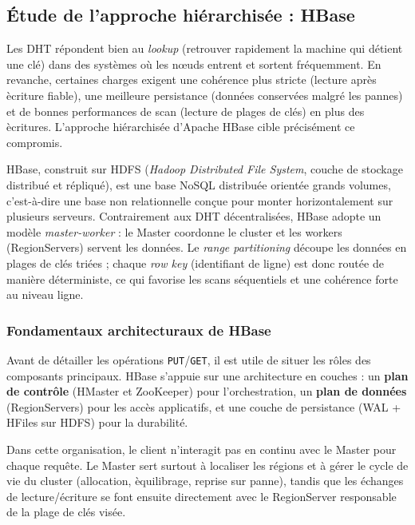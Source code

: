 \subsection{\'Etude de l'approche hi\'erarchis\'ee : HBase}

Les DHT r\'epondent bien au \emph{lookup} (retrouver rapidement la machine qui d\'etient une cl\'e) dans des syst\`emes o\`u les n\oe uds entrent et sortent fr\'equemment. En revanche, certaines charges exigent une coh\'erence plus stricte (lecture apr\`es \`ecriture fiable), une meilleure persistance (donn\'ees conserv\'ees malgr\'e les pannes) et de bonnes performances de scan (lecture de plages de cl\'es) en plus des \`ecritures. L'approche hi\'erarchis\'ee d'Apache HBase cible pr\'ecis\'ement ce compromis.


HBase, construit sur HDFS (\emph{Hadoop Distributed File System}, couche de stockage distribu\'e et r\'epliqu\'e), est une base NoSQL distribu\'ee orient\'ee grands volumes, c'est-\`a-dire une base non relationnelle con\c cue pour monter horizontalement sur plusieurs serveurs. Contrairement aux DHT d\'ecentralis\'ees, HBase adopte un mod\`ele \emph{master-worker} : le Master coordonne le cluster et les workers (RegionServers) servent les donn\'ees. Le \emph{range partitioning} d\'ecoupe les donn\'ees en plages de cl\'es tri\'ees ; chaque \emph{row key} (identifiant de ligne) est donc rout\'ee de mani\`ere d\'eterministe, ce qui favorise les scans s\'equentiels et une coh\'erence forte au niveau ligne.

\subsubsection{Fondamentaux architecturaux de HBase}

Avant de d\'etailler les op\'erations \texttt{PUT}/\texttt{GET}, il est utile de situer les r\^oles des composants principaux. HBase s'appuie sur une architecture en couches : un \textbf{plan de contr\^ole} (HMaster et ZooKeeper) pour l'orchestration, un \textbf{plan de donn\'ees} (RegionServers) pour les acc\`es applicatifs, et une couche de persistance (WAL + HFiles sur HDFS) pour la durabilit\'e.

Dans cette organisation, le client n'interagit pas en continu avec le Master pour chaque requ\^ete. Le Master sert surtout \`a localiser les r\'egions et \`a g\'erer le cycle de vie du cluster (allocation, \`equilibrage, reprise sur panne), tandis que les \'echanges de lecture/\'ecriture se font ensuite directement avec le RegionServer responsable de la plage de cl\'es vis\'ee.

